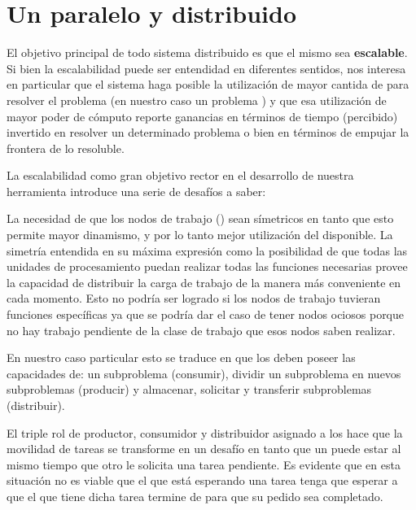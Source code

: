 

\chapter{Un \ssolver paralelo y distribuido }
\label{ssolver-pardist}

El objetivo principal de todo sistema distribuido es que el mismo sea
\textbf{escalable}. Si bien la escalabilidad puede ser entendidad en
diferentes sentidos, nos interesa en particular que el sistema haga posible la
utilización de mayor cantida de \hard para resolver el problema (en nuestro
caso un problema \sat) y que esa utilización de mayor poder de cómputo reporte
ganancias en términos de tiempo (percibido) invertido en resolver un
determinado problema o bien en términos de empujar la frontera de lo
resoluble.

La escalabilidad como gran objetivo rector en el desarrollo de nuestra
herramienta introduce una serie de desafíos a saber:

La necesidad de que los nodos de trabajo (\ws) sean símetricos en
tanto que esto permite mayor dinamismo, y por lo tanto mejor utilización del
\hard disponible. La simetría entendida en su máxima expresión como la
posibilidad de que todas las unidades de procesamiento puedan realizar todas
las funciones necesarias provee la capacidad de distribuir la carga de trabajo
de la manera más conveniente en cada momento. Esto no podría ser logrado si
los nodos de trabajo tuvieran funciones específicas ya que se podría dar el
caso de tener nodos ociosos porque no hay trabajo pendiente de la clase de
trabajo que esos nodos saben realizar.

En nuestro caso particular esto se traduce en que los \ws deben poseer las
capacidades de: \solvear {} un
subproblema (consumir), dividir un subproblema en nuevos subproblemas
(producir) y almacenar, solicitar y transferir subproblemas (distribuir).

El triple rol de productor, consumidor y distribuidor asignado a los \ws hace
que la movilidad de tareas se transforme en un desafío en tanto que un \w
puede estar \solveando al mismo tiempo que otro \w le solicita una tarea
pendiente. Es evidente que en esta situación no es viable que el \w que está
esperando una tarea tenga que esperar a que el \w que tiene dicha tarea
termine de \solvear para que su pedido sea completado.

